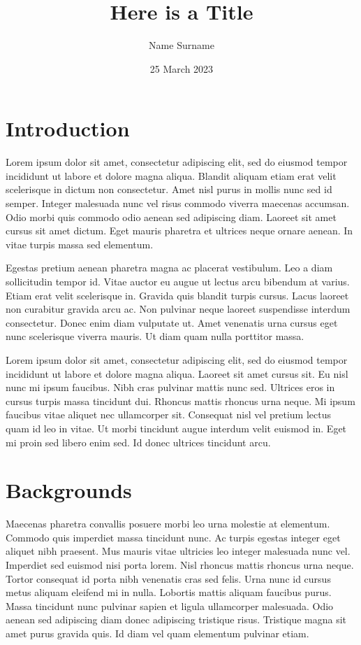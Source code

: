 \documentclass{article}
\title{Here is a Title}
\author{Name Surname}
\date{25 March 2023}
\begin{document}
\maketitle

\tableofcontents

\section{Introduction}

Lorem ipsum dolor sit amet, consectetur adipiscing elit, sed do eiusmod tempor incididunt ut labore et dolore magna aliqua. Blandit aliquam etiam erat velit scelerisque in dictum non consectetur. Amet nisl purus in mollis nunc sed id semper. Integer malesuada nunc vel risus commodo viverra maecenas accumsan. Odio morbi quis commodo odio aenean sed adipiscing diam. Laoreet sit amet cursus sit amet dictum. Eget mauris pharetra et ultrices neque ornare aenean. In vitae turpis massa sed elementum.

Egestas pretium aenean pharetra magna ac placerat vestibulum. Leo a diam sollicitudin tempor id. Vitae auctor eu augue ut lectus arcu bibendum at varius. Etiam erat velit scelerisque in. Gravida quis blandit turpis cursus. Lacus laoreet non curabitur gravida arcu ac. Non pulvinar neque laoreet suspendisse interdum consectetur. Donec enim diam vulputate ut. Amet venenatis urna cursus eget nunc scelerisque viverra mauris. Ut diam quam nulla porttitor massa.

Lorem ipsum dolor sit amet, consectetur adipiscing elit, sed do eiusmod tempor incididunt ut labore et dolore magna aliqua. Laoreet sit amet cursus sit. Eu nisl nunc mi ipsum faucibus. Nibh cras pulvinar mattis nunc sed. Ultrices eros in cursus turpis massa tincidunt dui. Rhoncus mattis rhoncus urna neque. Mi ipsum faucibus vitae aliquet nec ullamcorper sit. Consequat nisl vel pretium lectus quam id leo in vitae. Ut morbi tincidunt augue interdum velit euismod in. Eget mi proin sed libero enim sed. Id donec ultrices tincidunt arcu.

\section{Backgrounds}

Maecenas pharetra convallis posuere morbi leo urna molestie at elementum. Commodo quis imperdiet massa tincidunt nunc. Ac turpis egestas integer eget aliquet nibh praesent. Mus mauris vitae ultricies leo integer malesuada nunc vel. Imperdiet sed euismod nisi porta lorem. Nisl rhoncus mattis rhoncus urna neque. Tortor consequat id porta nibh venenatis cras sed felis. Urna nunc id cursus metus aliquam eleifend mi in nulla. Lobortis mattis aliquam faucibus purus. Massa tincidunt nunc pulvinar sapien et ligula ullamcorper malesuada. Odio aenean sed adipiscing diam donec adipiscing tristique risus. Tristique magna sit amet purus gravida quis. Id diam vel quam elementum pulvinar etiam.
\end{document}
